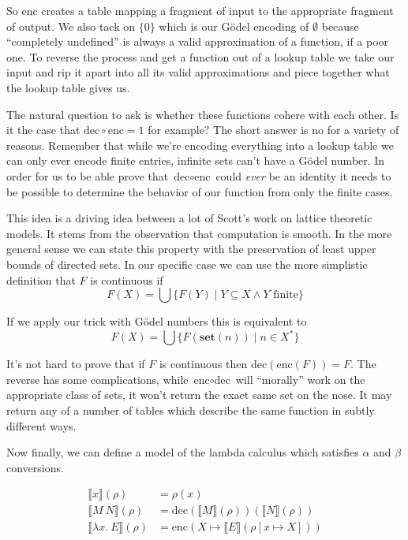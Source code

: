 \documentclass{amsart}
\newcommand{\set}[1]{\ensuremath{\mathbf{set}(#1)}}
\newcommand{\enc}{\text{enc}}
\newcommand{\dec}{\text{dec}}
\newcommand{\bbrack}[1]{\ensuremath{\llbracket #1 \rrbracket}}
\begin{document}
So $\enc$ creates a table mapping a fragment of input to the
appropriate fragment of output. We also tack on $\{0\}$ which is our
G\"odel encoding of $\emptyset$ because ``completely undefined'' is
always a valid approximation of a function, if a poor one. To reverse
the process and get a function out of a lookup table we take our input
and rip it apart into all its valid approximations and piece together
what the lookup table gives us.

The natural question to ask is whether these functions cohere with
each other. Is it the case that $\dec \circ \enc = 1$ for example?
The short answer is no for a variety of reasons. Remember that while
we're encoding everything into a lookup table we can only ever encode
finite entries, infinite sets can't have a G\"odel number. In order
for us to be able prove that $\dec \circ \enc$ could \emph{ever} be an
identity it needs to be possible to determine the behavior of our
function from only the finite cases.

This idea is a driving idea between a lot of Scott's work on lattice
theoretic models. It stems from the observation that computation is
smooth. In the more general sense we can state this property with the
preservation of least upper bounds of directed sets. In our specific
case we can use the more simplistic definition that $F$ is continuous
if
\[
  F(X) = \bigcup \{F(Y) \mid Y \subseteq X \wedge Y \text{ finite}\}
\]

If we apply our trick with G\"odel numbers this is equivalent to
\[
  F(X) = \bigcup \{F(\set{n}) \mid n \in X^*\}
\]

It's not hard to prove that if $F$ is continuous then
$\dec(\enc(F)) = F$. The reverse has some complications, while
$\enc \circ \dec$ will ``morally'' work on the appropriate class of
sets, it won't return the exact same set on the nose. It may return
any of a number of tables which describe the same function in subtly
different ways.

Now finally, we can define a model of the lambda calculus which
satisfies $\alpha$ and $\beta$ conversions.

\begin{align*}
  \bbrack{x}(\rho) &= \rho(x)\\
  \bbrack{M\ N}(\rho) &= \dec(\bbrack{M}(\rho))(\bbrack{N}(\rho))\\
  \bbrack{\lambda x.\ E}(\rho) &= \enc(X \mapsto \bbrack{E}(\rho[x \mapsto X]))
\end{align*}
\end{document}

